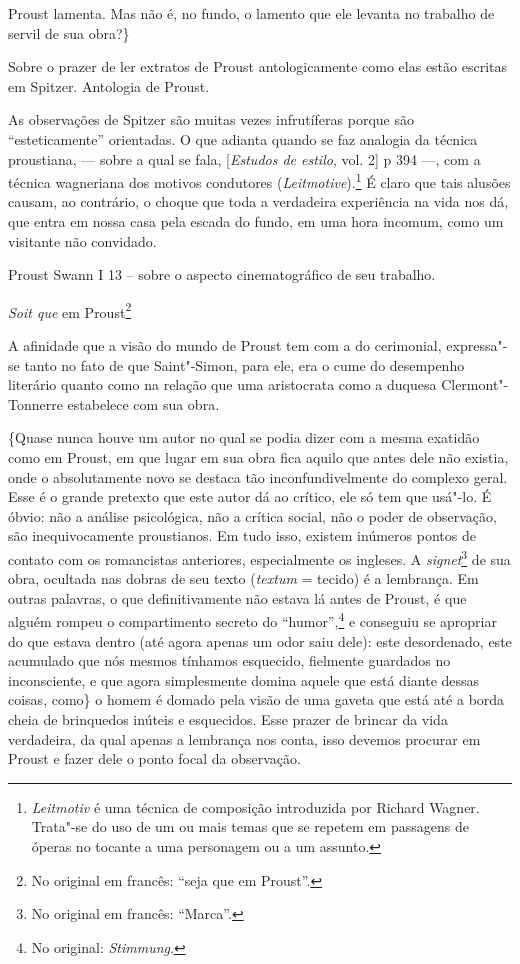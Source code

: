 Proust lamenta. Mas não é, no fundo, o lamento que ele levanta no
trabalho de servil de sua obra?\}

Sobre o prazer de ler extratos de Proust antologicamente como elas estão
escritas em Spitzer. Antologia de Proust.

As observações de Spitzer são muitas vezes infrutíferas porque são
``esteticamente'' orientadas. O que adianta quando se faz analogia da
técnica proustiana, --- sobre a qual se fala, {[}\emph{Estudos de estilo},
vol. 2{]} p 394 ---, com a técnica wagneriana dos motivos condutores
(\emph{Leitmotive}).\footnote{\emph{Leitmotiv} é uma técnica de
  composição introduzida por Richard Wagner. Trata"-se do uso de um ou
  mais temas que se repetem em passagens de óperas no tocante a uma
  personagem ou a um assunto. \versal{[N. E.]}} É claro que tais alusões causam, ao
contrário, o choque que toda a verdadeira experiência na vida nos dá,
que entra em nossa casa pela escada do fundo, em uma hora incomum, como
um visitante não convidado.

Proust Swann I 13 -- sobre o aspecto cinematográfico de seu trabalho.

\emph{Soit que} em Proust\footnote{No original em francês: ``seja
  que em Proust''. \versal{[N. T.]}}

A afinidade que a visão do mundo de Proust tem com a do cerimonial,
expressa"-se tanto no fato de que Saint"-Simon, para ele, era o cume do
desempenho literário quanto como na relação que uma aristocrata como a
duquesa Clermont"-Tonnerre estabelece com sua obra.

\{Quase nunca houve um autor no qual se podia dizer com a mesma exatidão
como em Proust, em que lugar em sua obra fica aquilo que antes dele não
existia, onde o absolutamente novo se destaca tão inconfundivelmente do
complexo geral. Esse é o grande pretexto que este autor dá ao crítico,
ele só tem que usá"-lo. É óbvio: não a análise psicológica, não a crítica
social, não o poder de observação, são inequivocamente proustianos. Em
tudo isso, existem inúmeros pontos de contato com os romancistas
anteriores, especialmente os ingleses. A \emph{signet}\footnote{No
  original em francês: ``Marca''. \versal{[N. T.]}} de sua obra, ocultada nas dobras de
seu texto (\emph{textum} = tecido) é a lembrança. Em outras palavras, o
que definitivamente não estava lá antes de Proust, é que alguém rompeu o
compartimento secreto do ``humor'',\footnote{No original:
  \emph{Stimmung}. \versal{[N. T.]}} e conseguiu se apropriar do que estava dentro (até
agora apenas um odor saiu dele): este desordenado, este acumulado que
nós mesmos tínhamos esquecido, fielmente guardados no inconsciente, e
que agora simplesmente domina aquele que está diante dessas coisas,
como\} o homem é domado pela visão de uma gaveta que está até a borda
cheia de brinquedos inúteis e esquecidos. Esse prazer de brincar da vida
verdadeira, da qual apenas a lembrança nos conta, isso devemos procurar
em Proust e fazer dele o ponto focal da observação.

